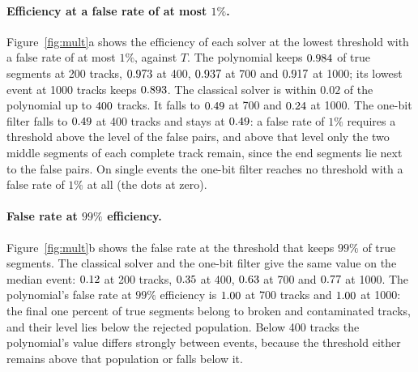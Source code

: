 \documentclass[11pt,a4paper]{article}
\newcommand{\eff}{\ensuremath{\varepsilon_{\rm seg}}}
\newcommand{\far}{\ensuremath{f_{\rm seg}}}
\newcommand{\gss}[1]{{\color{teal} #1}}
\begin{document}
\begin{table}[H]
\centering\footnotesize
\caption{\gss{\textbf{Segment-level metrics of each solver}, means over the $\NEvents$ events with the standard error of the mean: segment efficiency $\eff$, segment false rate $\far$ and the number of false segments kept, at the thresholds of figure~\ref{fig:segmetrics}.}}
\label{tab:segmetrics}

\end{table}

\paragraph{Efficiency at a false rate of at most $1\%$.}
Figure~\ref{fig:mult}a shows the efficiency of each solver at the lowest threshold with a false rate
of at most $1\%$, against $T$. The polynomial keeps $0.984$ of true segments at 200
tracks, $0.973$ at 400, $0.937$ at 700 and $0.917$ at 1000;
its lowest event at 1000 tracks keeps $0.893$. The classical solver is within $0.02$
of the polynomial up to $400$ tracks. It falls to $0.49$ at 700
and $0.24$ at 1000. The one-bit filter falls to $0.49$ at
400 tracks and stays at $0.49$: a false rate of $1\%$ requires a threshold above the
level of the false pairs, and above that level only the two middle segments of each complete track
remain, since the end segments lie next to the false pairs. On single events the one-bit filter
reaches no threshold with a false rate of $1\%$ at all (the dots at zero).

\paragraph{False rate at $99\%$ efficiency.}
Figure~\ref{fig:mult}b shows the false rate at the threshold that keeps $99\%$ of true segments.
The classical solver and the one-bit filter give the same value on the median event:
$0.12$ at 200 tracks, $0.35$ at 400, $0.63$ at
700 and $0.77$ at 1000. The polynomial's false rate at $99\%$ efficiency is
$1.00$ at 700 tracks and $1.00$ at 1000: the final one percent of true
segments belong to broken and contaminated tracks, and their level lies below the rejected population.
Below 400 tracks the polynomial's value differs strongly between events, because the threshold either remains
above that population or falls below it.
\end{document}
